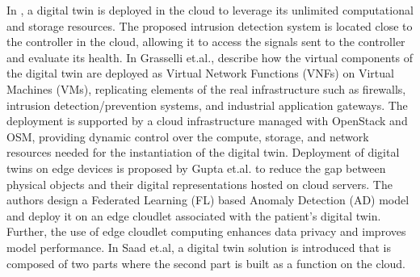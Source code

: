 In \cite{akbarianSecurityFrameworkDigital2021}, a digital twin is deployed in the cloud to leverage its unlimited computational and storage resources. The proposed intrusion detection system is located close to the controller in the cloud, allowing it to access the signals sent to the controller and evaluate its health.
In \cite{grasselliIndustrialNetworkDigital2022} Grasselli et.al., describe how the virtual components of the digital twin are deployed as Virtual Network Functions (VNFs) on Virtual Machines (VMs), replicating elements of the real infrastructure such as firewalls, intrusion detection/prevention systems, and industrial application gateways. The deployment is supported by a cloud infrastructure managed with OpenStack and OSM, providing dynamic control over the compute, storage, and network resources needed for the instantiation of the digital twin.
Deployment of digital twins on edge devices is proposed by Gupta et.al.\cite{guptaHierarchicalFederatedLearning2021} to reduce the gap between physical objects and their digital representations hosted on cloud servers. The authors design a Federated Learning (FL) based Anomaly Detection (AD) model and deploy it on an edge cloudlet associated with the patient's digital twin. Further, the use of edge cloudlet computing enhances data privacy and improves model performance.
In \cite{saadImplementationIoTBasedDigital2020} Saad et.al, a digital twin solution is introduced that is composed of two parts where the second part is built as a function on the cloud.

